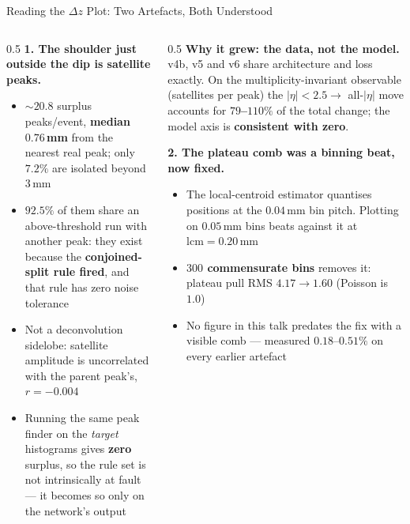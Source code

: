 \documentclass[xcolor=table,aspectratio=169]{beamer}
\begin{document}
\begin{frame}{Reading the $\Delta z$ Plot: Two Artefacts, Both Understood}
    \begin{columns}[t]
        \begin{column}{0.5\linewidth}
            \small
            \textbf{1. The shoulder just outside the dip is satellite peaks.}
            \begin{itemize}\setlength\itemsep{0.2em}
                \item ${\sim}20.8$ surplus peaks/event, \textbf{median $0.76$\,mm} from
                    the nearest real peak; only $7.2\%$ are isolated beyond $3$\,mm
                \item \textbf{$92.5\%$} of them share an above-threshold run with
                    another peak: they exist because the \textbf{conjoined-split rule
                    fired}, and that rule has zero noise tolerance
                \item \textcolor{black!60}{Not a deconvolution sidelobe: satellite
                    amplitude is uncorrelated with the parent peak's,
                    $r = -0.004$}
                \item Running the same peak finder on the \emph{target} histograms
                    gives \textbf{zero} surplus, so the rule set is not intrinsically
                    at fault --- it becomes so only on the network's output
            \end{itemize}
        \end{column}
        \begin{column}{0.5\linewidth}
            \small
            \textbf{Why it grew: the data, not the model.}
            v4b, v5 and v6 share architecture and loss exactly. On the
            multiplicity-invariant observable (satellites per peak) the
            $|\eta|<2.5 \to$ all-$|\eta|$ move accounts for \textbf{$79$--$110\%$} of
            the total change; the model axis is \textbf{consistent with zero}.
            \vspace{0.5em}

            \textbf{2. The plateau comb was a binning beat, now fixed.}
            \begin{itemize}\setlength\itemsep{0.2em}
                \item The local-centroid estimator quantises positions at the
                    $0.04$\,mm bin pitch. Plotting on $0.05$\,mm bins beats against it
                    at $\mathrm{lcm}=0.20$\,mm
                \item \textbf{$300$ commensurate bins} removes it: plateau pull RMS
                    $4.17 \to 1.60$ (Poisson is $1.0$)
                \item \textcolor{black!60}{No figure in this talk predates the fix
                    with a visible comb --- measured $0.18$--$0.51\%$ on every
                    earlier artefact}
            \end{itemize}
        \end{column}
    \end{columns}
\end{frame}
\end{document}
